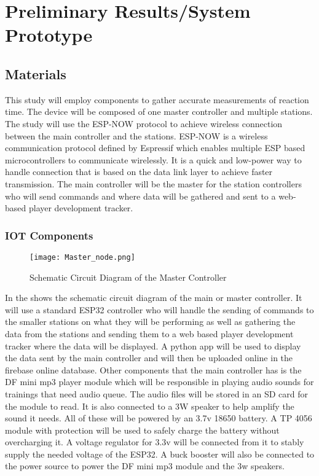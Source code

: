 \chapter{Preliminary Results/System Prototype}

\section{Materials}
This study will employ components to gather accurate measurements of reaction time. The device will be composed of one master controller and multiple stations. The study will use the ESP-NOW protocol to achieve wireless connection between the main controller and the stations. ESP-NOW is a wireless communication protocol defined by Espressif which enables multiple ESP based microcontrollers to communicate wirelessly. It is a quick and low-power way to handle connection that is based on the data link layer to achieve faster transmission. The main controller will be the master for the station controllers who will send commands and where data will be gathered and sent to a web-based player development tracker.

\subsection{IOT Components}
\begin{figure}[h]               
	\centering                    
	\texttt{[image: Master\_node.png]}      
	\caption{Schematic Circuit Diagram of the Master Controller }
	\label{fig:Master_node}
\end{figure}

In the  shows the schematic circuit diagram of the main or master controller. It will use a standard ESP32 controller who will handle the sending of commands to the smaller stations on what they will be performing as well as gathering the data from the stations and sending them to a web based player development tracker where the data will be displayed. A python app will be used to display the data sent by the main controller and will then be uploaded online in the firebase online database. Other components that the main controller has is the DF mini mp3 player module which will be responsible in playing audio sounds for trainings that need audio queue. The audio files will be stored in an SD card for the module to read. It is also connected to a 3W speaker to help amplify the sound it needs. All of these will be powered by an 3.7v 18650 battery. A TP 4056 module  with protection will be used to safely charge the battery without overcharging it. A voltage regulator for 3.3v will be connected from it to stably supply the needed voltage of the ESP32. A buck booster will also be connected to the power source to power the DF mini mp3 module and the 3w speakers.

